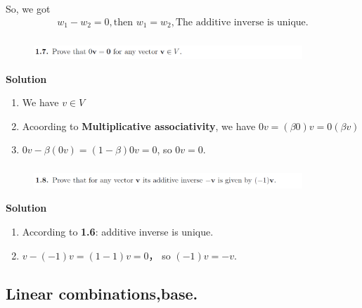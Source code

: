 \documentclass[cs4size,a4paper]{ctexart}
\numberwithin{equation}{section}
\numberwithin{table}{section}
\numberwithin{figure}{section}
\begin{document}
So, we got 
\begin{align}
	w_1 - w_2 = 0, \text{then } w_1 = w_2,\text{The additive inverse is unique.}
\end{align}
 \subsubsection{}
\begin{figure}[H]
	\centering
	\includegraphics[width=0.9\textwidth]{1-7.png}
\end{figure}
\textbf{Solution}
\begin{enumerate}
	\item We have $v \in V$
	\item Acoording to \textbf{Multiplicative associativity}, we have $0v = (\beta 0)v = 0(\beta v)$
	\item $0v - \beta (0v) = (1-\beta)0v = 0$, so $ 0v = 0$.
\end{enumerate}
 \subsubsection{}
\begin{figure}[H]
	\centering
	\includegraphics[width=0.9\textwidth]{1-8.png}
\end{figure}
\textbf{Solution}
\begin{enumerate}
	\item According to \textbf{1.6}: additive inverse is unique.
	\item $v - (-1)v = (1-1)v = 0$， so $(-1)v = -v$.
\end{enumerate}
\pagebreak
\subsection{Linear combinations,base.}
\end{document}

